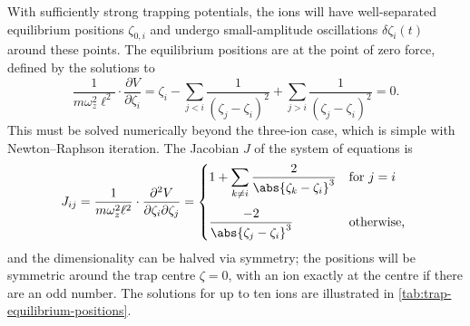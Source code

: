 With sufficiently strong trapping potentials, the ions will have well-separated equilibrium positions $\zeta_{0,i}$ and undergo small-amplitude oscillations $\delta\zeta_i(t)$ around these points.
The equilibrium positions are at the point of zero force, defined by the solutions to
\begin{equation}\label{eq:trap-equilibrium-positions}
\frac1{m\omega_z^2\ell^2}\cdot\frac{\partial V}{\partial \zeta_i}
    = \zeta_i - \sum_{j<i}\frac1{{(\zeta_j-\zeta_i)}^2} + \sum_{j>i}\frac1{{(\zeta_j-\zeta_i)}^2}
    = 0.
\end{equation}
This must be solved numerically beyond the three-ion case, which is simple with Newton--Raphson iteration.
The Jacobian $J$ of the system of equations is
\begin{equation}
J_{ij} = \frac1{m\omega_z^2\ell^2}\cdot\frac{\partial^2V}{\partial\zeta_i\partial\zeta_j} = \begin{dcases*}
    1 + \sum_{k\neq i}\frac2{{\abs{\zeta_k - \zeta_i}}^3} & for $j = i$\\[0.4em]
    \frac{-2}{{\abs{\zeta_j - \zeta_i}}^3} & otherwise,
\end{dcases*}
\end{equation}
and the dimensionality can be halved via symmetry; the positions will be symmetric around the trap centre $\zeta=0$, with an ion exactly at the centre if there are an odd number.
The solutions for up to ten ions are illustrated in \cref{tab:trap-equilibrium-positions}.

